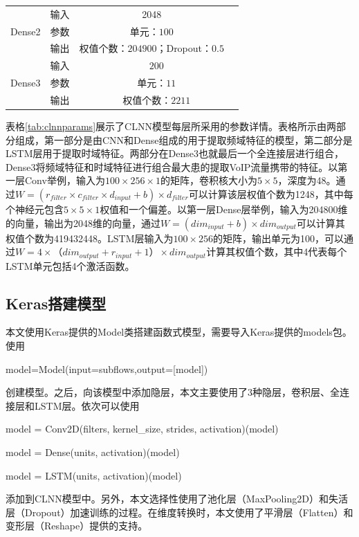 \begin{table} [htb]
\begin{tabular}{|c|c|c|c|}
\cline{1-3}
\multirow{3}{*}{Dense2}&
输入& 2048 & \\
\cline{2-3}
  & 参数&单元：$100$ &  \\
\cline{2-3}
  & 输出 & 权值个数：$204900$；Dropout：$0.5$ &  \\  
\hline
\multirow{3}{*}{Dense3}&
输入&\multicolumn{2}{c|}{$200$} \\
\cline{2-4}&
参数&\multicolumn{2}{c|}{单元：$11$}\\
\cline{2-4}&
输出&\multicolumn{2}{c|}{权值个数：$2211$}\\
\hline
\end{tabular}
\end{table}

表格\ref{tab:clnnparams}展示了CLNN模型每层所采用的参数详情。表格所示由两部分组成，第一部分是由CNN和Dense组成的用于提取频域特征的模型，第二部分是LSTM层用于提取时域特征。两部分在Dense3也就最后一个全连接层进行组合，Dense3将频域特征和时域特征进行组合最大患的提取VoIP流量携带的特征。以第一层Conv举例，输入为$100 \times 256 \times 1$的矩阵，卷积核大小为$5 \times 5 $，深度为48。通过${W} = (r_{filter} \times c_{filter} \times d_{input} + b) \times d_{filter}$可以计算该层权值个数为1248，其中每个神经元包含$5 \times 5 \times 1$权值和一个偏差。以第一层Dense层举例，输入为204800维的向量，输出为2048维的向量，通过${W} = (dim_{input} + b) \times dim_{output}$可以计算其权值个数为419432448。LSTM层输入为$100 \times 256$的矩阵，输出单元为100，可以通过${W} = 4 \times （dim_{output}+r_{input}+1）\times dim_{output}$计算其权值个数，其中4代表每个LSTM单元包括4个激活函数。



\subsection{Keras搭建模型}
本文使用Keras提供的Model类搭建函数式模型，需要导入Keras提供的models包。使用
\begin{center}
model=Model(input=subflows,output=[model])
\end{center}
创建模型。之后，向该模型中添加隐层，本文主要使用了3种隐层，卷积层、全连接层和LSTM层。依次可以使用
\begin{center}
model = Conv2D(filters, kernel\_size, strides, activation)(model)
\end{center}
\begin{center}
model = Dense(units, activation)(model)
\end{center}
\begin{center}
model = LSTM(units, activation)(model)
\end{center}
添加到CLNN模型中。另外，本文选择性使用了池化层（MaxPooling2D）和失活层（Dropout）加速训练的过程。在维度转换时，本文使用了平滑层（Flatten）和变形层（Reshape）提供的支持。

